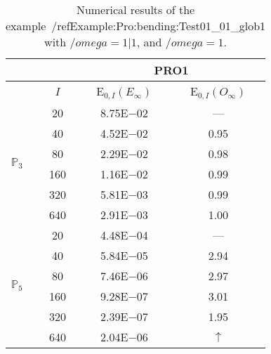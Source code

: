 \begin{table}[H]
\caption{Numerical results of the example~/ref{Example:Pro:bending:Test01_01_glob1} with $/omega=1|1$, and $/omega=1$.}
\setlength{\tabcolsep}{5pt}
\centering
\begin{tabular}{@{}l c c c@{}}
\toprule
 &  & \multicolumn{2}{c}{PRO1}\\
\midrule
 & $I$ & E$_{0,I}(E_{\infty})$ & E$_{0,I}(O_{\infty})$\\
\midrule
\multirow{6}{*}{$\mathbb{P}_{3}$}
 & 20 & 8.75E$-$02 & ---\\
 & 40 & 4.52E$-$02 & 0.95\\
 & 80 & 2.29E$-$02 & 0.98\\
 & 160 & 1.16E$-$02 & 0.99\\
 & 320 & 5.81E$-$03 & 0.99\\
 & 640 & 2.91E$-$03 & 1.00\\
\midrule
\multirow{6}{*}{$\mathbb{P}_{5}$}
 & 20 & 4.48E$-$04 & ---\\
 & 40 & 5.84E$-$05 & 2.94\\
 & 80 & 7.46E$-$06 & 2.97\\
 & 160 & 9.28E$-$07 & 3.01\\
 & 320 & 2.39E$-$07 & 1.95\\
 & 640 & 2.04E$-$06 & $\uparrow$\\
\bottomrule
\end{tabular}
\label{Table:PRO:test_01_01_test1_pro1}
\end{table}
